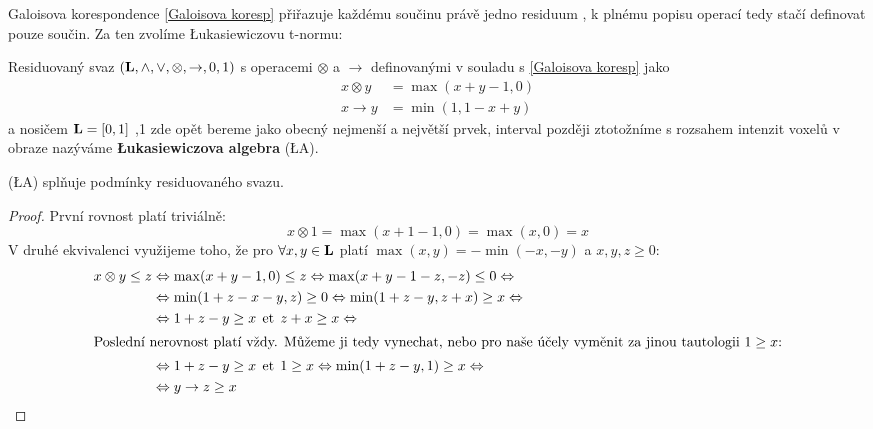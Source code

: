     Galoisova korespondence \eqref{Galoisova koresp} přiřazuje každému součinu právě jedno residuum \cite{MajerovaPhD}, k plnému popisu operací tedy stačí definovat pouze součin. Za ten zvolíme \L ukasiewiczovu t-normu:

    \begin{define}\label{LA}
    Residuovaný svaz $(\mathbf{L},\wedge,\vee,\otimes,\rightarrow,0,1)$ s operacemi $\otimes$ a $\rightarrow$ definovanými v souladu s \eqref{Galoisova koresp} jako
    \begin{align}
    x \otimes y &= \max(x+y-1,0) \\
    x \rightarrow y &= \min(1,1-x+y)
    \end{align}
    a nosičem $\mathbf{L} = [0,1]$ ,1 zde opět bereme jako obecný nejmenší a největší prvek, interval později ztotožníme s rozsahem intenzit voxelů v obraze\rr {} nazýváme \textbf{\L ukasiewiczova algebra} \textup{(\L A)}.
    \end{define}

    \begin{theo}
      \textup{(\L A)} splňuje podmínky residuovaného svazu.
    \end{theo}
    \begin{proof}
    První rovnost platí triviálně:
      \[
      x \otimes 1 = \max(x+1-1,0) = \max(x,0) = x
      \]
    V druhé ekvivalenci využijeme toho, že pro $\forall x,y \in \mathbf{L}$ platí $\max(x,y) = -\min(-x,-y)$ a $x,y,z \geq 0$:
    \begin{align*}
      x \otimes y \leq z &\Leftrightarrow \max(x+y-1,0) \leq z \Leftrightarrow \max(x+y-1-z,-z) \leq 0 \Leftrightarrow\\
      &\Leftrightarrow \min(1+z-x-y,z) \geq 0 \Leftrightarrow \min(1+z-y,z+x) \geq x \Leftrightarrow\\
      &\Leftrightarrow 1+z-y \geq x \;\,\mathrm{et}\;\, z+x \geq x \Leftrightarrow\\
    \intertext{Poslední nerovnost platí vždy. Můžeme ji tedy vynechat, nebo pro naše účely vyměnit za jinou tautologii $1 \geq x$:}
      &\Leftrightarrow 1+z-y \geq x \;\,\mathrm{et}\;\, 1 \geq x \Leftrightarrow \min(1+z-y,1) \geq x \Leftrightarrow\\
      &\Leftrightarrow y \rightarrow z \geq x
    \end{align*}
    \end{proof}


